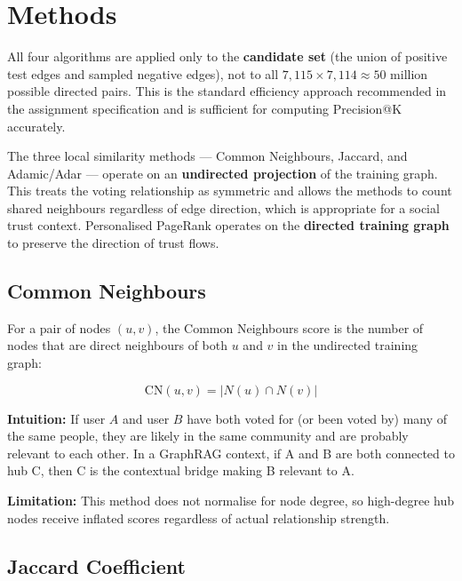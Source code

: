 \documentclass[10pt]{article}
\begin{document}
\section{Methods}
\label{sec:methods}

All four algorithms are applied only to the \textbf{candidate set} (the union of positive test edges and sampled negative edges), not to all $7{,}115 \times 7{,}114 \approx 50$ million possible directed pairs. This is the standard efficiency approach recommended in the assignment specification and is sufficient for computing Precision@K accurately.

The three local similarity methods --- Common Neighbours, Jaccard, and Adamic/Adar --- operate on an \textbf{undirected projection} of the training graph. This treats the voting relationship as symmetric and allows the methods to count shared neighbours regardless of edge direction, which is appropriate for a social trust context. Personalised PageRank operates on the \textbf{directed training graph} to preserve the direction of trust flows.

\subsection{Common Neighbours}

For a pair of nodes $(u, v)$, the Common Neighbours score is the number of nodes that are direct neighbours of both $u$ and $v$ in the undirected training graph:

\begin{equation}
  \text{CN}(u, v) = |N(u) \cap N(v)|
  \label{eq:cn}
\end{equation}

\noindent\textbf{Intuition:} If user $A$ and user $B$ have both voted for (or been voted by) many of the same people, they are likely in the same community and are probably relevant to each other. In a GraphRAG context, if A and B are both connected to hub C, then C is the contextual bridge making B relevant to A.

\noindent\textbf{Limitation:} This method does not normalise for node degree, so high-degree hub nodes receive inflated scores regardless of actual relationship strength.

\subsection{Jaccard Coefficient}
\end{document}
